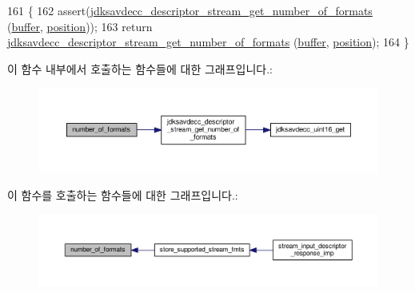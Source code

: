 \begin{DoxyCode}
161 \{
162     assert(\hyperlink{group__descriptor__stream_gaeb76e60867af744978aafba4150e1f83}{jdksavdecc\_descriptor\_stream\_get\_number\_of\_formats}
      (\hyperlink{classavdecc__lib_1_1descriptor__response__base__imp_a56ed84df35de10bdb65e72b184309497}{buffer}, \hyperlink{classavdecc__lib_1_1descriptor__response__base__imp_a7a04afe5347934be732ec70a70bd0a28}{position}));
163     \textcolor{keywordflow}{return} \hyperlink{group__descriptor__stream_gaeb76e60867af744978aafba4150e1f83}{jdksavdecc\_descriptor\_stream\_get\_number\_of\_formats}
      (\hyperlink{classavdecc__lib_1_1descriptor__response__base__imp_a56ed84df35de10bdb65e72b184309497}{buffer}, \hyperlink{classavdecc__lib_1_1descriptor__response__base__imp_a7a04afe5347934be732ec70a70bd0a28}{position});
164 \}
\end{DoxyCode}


이 함수 내부에서 호출하는 함수들에 대한 그래프입니다.\+:
\nopagebreak
\begin{figure}[H]
\begin{center}
\leavevmode
\includegraphics[width=350pt]{classavdecc__lib_1_1stream__input__descriptor__response__imp_a159e8e8c593b548faf249fc404afa7e3_cgraph}
\end{center}
\end{figure}




이 함수를 호출하는 함수들에 대한 그래프입니다.\+:
\nopagebreak
\begin{figure}[H]
\begin{center}
\leavevmode
\includegraphics[width=350pt]{classavdecc__lib_1_1stream__input__descriptor__response__imp_a159e8e8c593b548faf249fc404afa7e3_icgraph}
\end{center}
\end{figure}


